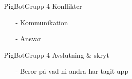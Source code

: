 \begin{frame}[fragile]{PigBot}{Grupp 4}
Konflikter
  \begin{itemize}
 \pause
    \item[-] Kommunikation
\pause
    \item[-] Ansvar
  \end{itemize}
\end{frame}

\begin{frame}[fragile]{PigBot}{Grupp 4}
Avslutning \& skryt
  \begin{itemize}
 \pause
    \item[-] Beror på vad ni andra har tagit upp
  \end{itemize}
\end{frame}

